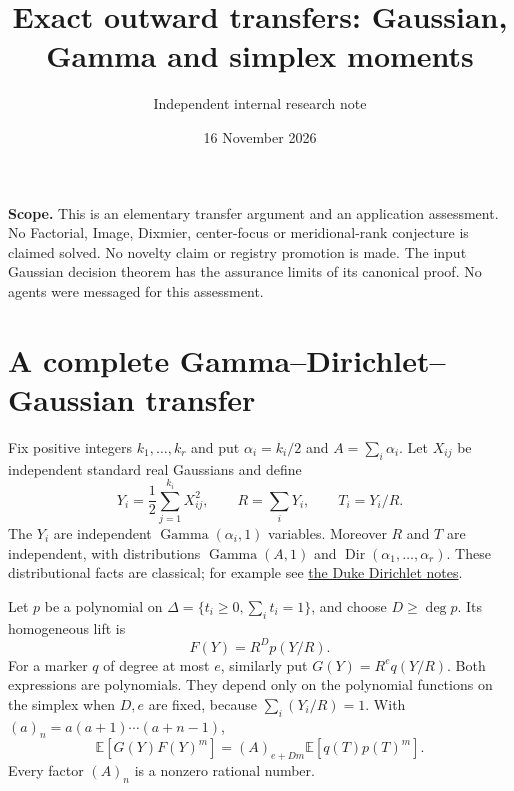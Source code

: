 \documentclass[11pt]{article}
\title{Exact outward transfers: Gaussian, Gamma and simplex moments}
\author{Independent internal research note}
\date{16 November 2026}
\newcommand{\E}{\mathbb E}
\begin{document}
\maketitle
\noindent\textbf{Scope.}
This is an elementary transfer argument and an application assessment.
No Factorial, Image, Dixmier, center-focus or meridional-rank conjecture is
claimed solved. No novelty claim or registry promotion is made. The input
Gaussian decision theorem has the assurance limits of its canonical proof.
No agents were messaged for this assessment.

\section{A complete Gamma--Dirichlet--Gaussian transfer}

Fix positive integers $k_1,\ldots,k_r$ and put
$\alpha_i=k_i/2$ and $A=\sum_i\alpha_i$.
Let $X_{ij}$ be independent standard real Gaussians and define
\[
 Y_i=\frac12\sum_{j=1}^{k_i}X_{ij}^2,\qquad
 R=\sum_iY_i,\qquad T_i=Y_i/R.
\]
The $Y_i$ are independent $\operatorname{Gamma}(\alpha_i,1)$ variables.
Moreover $R$ and $T$ are independent, with distributions
$\operatorname{Gamma}(A,1)$ and $\operatorname{Dir}(\alpha_1,\ldots,\alpha_r)$.
These distributional facts are classical; for example see
\href{https://www2.stat.duke.edu/~st118/sta941/dirichlet.pdf}{the Duke Dirichlet notes}.

Let $p$ be a polynomial on $\Delta=\{t_i\ge0,\sum_i t_i=1\}$, and
choose $D\ge\deg p$. Its homogeneous lift is
\[
 F(Y)=R^D p(Y/R).
\]
For a marker $q$ of degree at most $e$, similarly put
$G(Y)=R^e q(Y/R)$.
Both expressions are polynomials. They depend only on the polynomial
functions on the simplex when $D,e$ are fixed, because
$\sum_i(Y_i/R)=1$. With $(a)_n=a(a+1)\cdots(a+n-1)$,
\[
 \E[G(Y)F(Y)^m]=(A)_{e+Dm}\E[q(T)p(T)^m].                    \tag{1}
\]
Every factor $(A)_n$ is a nonzero rational number.
\end{document}

